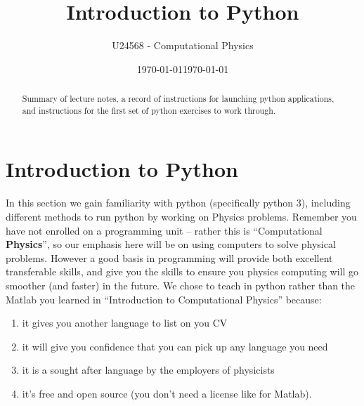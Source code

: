 \documentclass[%
 reprint,
 amsmath,amssymb,
 aps,
]{revtex4-1}
\begin{document}

\title{Introduction to Python}
\author         {U24568 - Computational Physics}
\date{\today}


\date{\today}%

\begin{abstract}
Summary of lecture notes, a record of instructions for launching python applications, and instructions for the first set of python exercises to work through. 
\end{abstract}

\maketitle


\section{\label{sec:intro} Introduction to Python}
In this section we gain familiarity with python (specifically python 3), including different methods to run python by working on Physics problems. Remember you have not enrolled on a programming unit -- rather this is ``Computational {\bf Physics}'',  so our emphasis here will be on using computers to solve physical problems. However a good basis in programming will provide both excellent transferable skills, and give you the skills to ensure you physics computing will go smoother (and faster) in the future. We chose to teach in python rather than the Matlab you learned in ``Introduction to Computational Physics'' because: 
\begin{enumerate}
\item it gives you another language to list on you CV
\item it will give you confidence that you can pick up any language you need
\item it is a sought after language by the employers of physicists
\item it's free and open source (you don't need a license like for Matlab). 
\end{enumerate}
\end{document}
